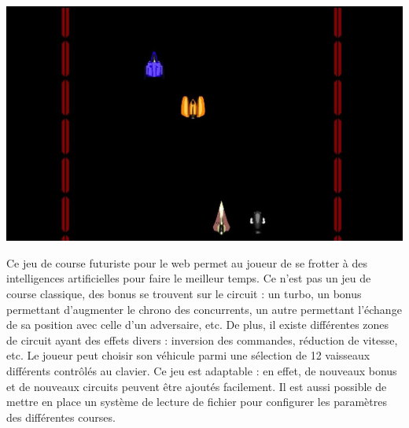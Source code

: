 \clearpage
{}
\begin{minipage}{6cm}
 \includegraphics[width=\linewidth]{img/capturejeu_course}
\end{minipage}
\hfill
\begin{minipage}{9cm}
Ce jeu de course futuriste pour le web permet au joueur de se frotter à des intelligences artificielles pour faire le meilleur temps. 
Ce n’est pas un jeu de course classique, des bonus se trouvent sur le circuit :
un turbo, un bonus permettant d’augmenter le chrono des concurrents, un autre permettant l'échange de sa position avec celle d'un adversaire, etc. 
De plus, il existe différentes zones de circuit ayant des effets divers : inversion des commandes, réduction de vitesse, etc.
Le joueur peut choisir son véhicule parmi une sélection de 12 vaisseaux différents contrôlés au clavier. 
Ce jeu est adaptable : en effet, de nouveaux bonus et de nouveaux circuits peuvent être ajoutés facilement.
Il est aussi possible de mettre en place un système de lecture de fichier pour configurer les paramètres des différentes courses.
\end{minipage}

